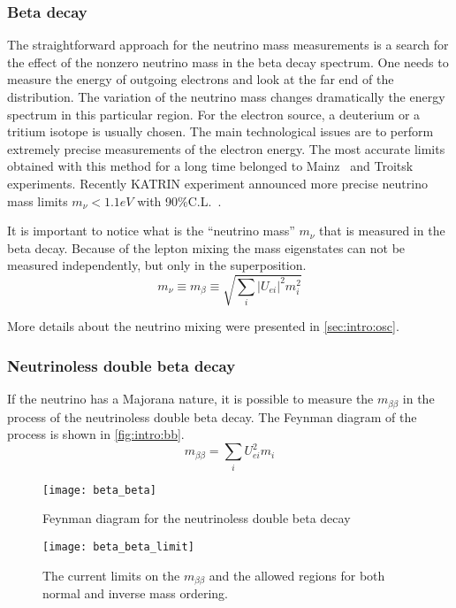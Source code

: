 \documentclass[../main.tex]{subfiles}
\begin{document}
\subsubsection{Beta decay}
The straightforward approach for the neutrino mass measurements is a search for the effect of the nonzero neutrino mass in the beta decay spectrum. One needs to measure the energy of outgoing electrons and look at the far end of the distribution. The variation of the neutrino mass changes dramatically the energy spectrum in this particular region. For the electron source, a deuterium or a tritium isotope is usually chosen. The main technological issues are to perform extremely precise measurements of the electron energy. The most accurate limits obtained with this method for a long time belonged to Mainz~\cite{Kraus2005} and Troitsk~\cite{Aseev2011} experiments. Recently KATRIN experiment announced more precise neutrino mass limits $m_\nu < 1.1 eV$ with 90\%C.L.~\cite{Aker2019}.

It is important to notice what is the ``neutrino mass'' $m_\nu$ that is measured in the beta decay. Because of the lepton mixing the mass eigenstates can not be measured independently, but only in the superposition.
\begin{equation}
m_\nu\equiv m_\beta\equiv\sqrt{\sum_i\left|U_{ei}\right|^2m_i^2}
\end{equation}

More details about the neutrino mixing were presented in \autoref{sec:intro:osc}.

\subsubsection{Neutrinoless double beta decay}
If the neutrino has a Majorana nature, it is possible to measure the $m_{\beta\beta}$ in the process of the neutrinoless double beta decay. The Feynman diagram of the process is shown in \autoref{fig:intro:bb}.
\begin{equation}
m_{\beta\beta}=\sum_i U^2_{ei}m_i
\end{equation}

\begin{figure}
  \centering
  \begin{minipage}{0.45\linewidth}
    \texttt{[image: beta\_beta]}
    \caption{Feynman diagram for the neutrinoless double beta decay}
    \label{fig:intro:bb}
  \end{minipage}
  \begin{minipage}{0.09\linewidth}
  \end{minipage}
  \begin{minipage}{0.45\linewidth}
    \texttt{[image: beta\_beta\_limit]}
    \caption{The current limits on the $m_{\beta\beta}$ and the allowed regions for both normal and inverse mass ordering.}
    \label{fig:intro:bb_lim}
  \end{minipage}
\end{figure}
\end{document}
